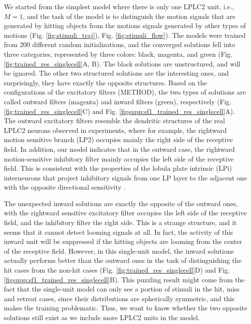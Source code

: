 \documentclass[9pt,lineno]{elife}
\begin{document}
We started from the simplest model where there is only one LPLC2 unit, i.e., $M=1$, and the task of the model is to distinguish the motion signals that are generated by hitting objects from the motions signals generated by other types of motions (Fig. \ref{fig:stimuli_traj}), Fig. \ref{fig:stimuli_flow}). The models were trained from 200 different random initializations, and the converged solutions fell into three categories, represented by three colors: black, magenta, and green (Fig. \ref{fig:trained_res_singlecell}A, B). The black solutions are unstructured, and will be ignored. The other two structured solutions are the interesting ones, and surprisingly, they have exactly the opposite structures. Based on the configurations of the excitatory filters (METHOD), the two types of solutions are called outward filters (magenta) and inward filters (green), respectively (Fig. \ref{fig:trained_res_singlecell}C) and Fig. \ref{figsupp:sf1_trained_res_singlecell}A). The outward excitatory filters resemble the dendritic structures of the real LPLC2 neurons observed in experiments, where for example, the rightward motion sensitive branch (LP2) occupies mainly the right side of the receptive field. In addition, our model indicates that in the outward case, the rightward motion-sensitive inhibitory filter mainly occupies the left side of the receptive field. This is consistent with the properties of the lobula plate intrinsic (LPi) interneurons that project inhibitory signals from one LP layer to the adjacent one with the opposite directional sensitivity \citep{mauss2015neural,klapoetke2017ultra}. 

The unexpected inward solutions are exactly the opposite of the outward ones, with the rightward sensitive excitatory filter occupies the left side of the receptive field, and the inhibitory filter the right side. This is a strange structure, and it seems that it cannot detect looming signals at all. In fact, the activity of this inward unit will be suppressed if the hitting objects are looming from the center of the receptive field. However, in this single-unit model, the inward solutions actually performs better than the outward ones in the task of distinguishing the hit cases from the non-hit cases (Fig. \ref{fig:trained_res_singlecell}D) and Fig. \ref{figsupp:sf1_trained_res_singlecell}B). This puzzling result might come from the fact that the single-unit model can only see a portion of stimuli in the hit, miss and retreat cases, since their distributions are spherically symmetric, and this makes the training problematic. Thus, we want to know whether the two opposite solutions still exist as we include more LPLC2 units in the model.
\end{document}

